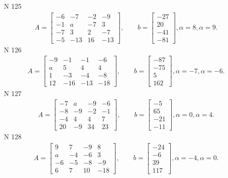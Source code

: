 \documentclass[11pt]{report}
\begin{document}
N 125
\begin{align*}
 A = \left[\begin{matrix}-6 & -7 & -2 & -9\\-1 & a & -7 & 3\\-7 & 3 & 2 & -7\\-5 & -13 & 16 & -13\end{matrix}\right],
    \qquad b = \left[\begin{matrix}-27\\20\\-41\\-81\end{matrix}\right], \alpha = 8, \alpha = 9. 
 \end{align*}
N 126
\begin{align*}
 A = \left[\begin{matrix}-9 & -1 & -1 & -6\\a & 5 & 4 & 4\\1 & -3 & -4 & -8\\12 & -16 & -13 & -18\end{matrix}\right],
    \qquad b = \left[\begin{matrix}-87\\-75\\5\\162\end{matrix}\right], \alpha = -7, \alpha = -6. 
 \end{align*}
N 127
\begin{align*}
 A = \left[\begin{matrix}-7 & a & -9 & -6\\-8 & -9 & -2 & -1\\-4 & 4 & 4 & 7\\20 & -9 & 34 & 23\end{matrix}\right],
    \qquad b = \left[\begin{matrix}-5\\65\\-21\\-11\end{matrix}\right], \alpha = 0, \alpha = 4. 
 \end{align*}
N 128
\begin{align*}
 A = \left[\begin{matrix}9 & 7 & -9 & 8\\a & -4 & -6 & 3\\-6 & -5 & -8 & -9\\6 & 7 & 10 & -18\end{matrix}\right],
    \qquad b = \left[\begin{matrix}-24\\-6\\39\\117\end{matrix}\right], \alpha = -4, \alpha = 0. 
 \end{align*}
\end{document}
